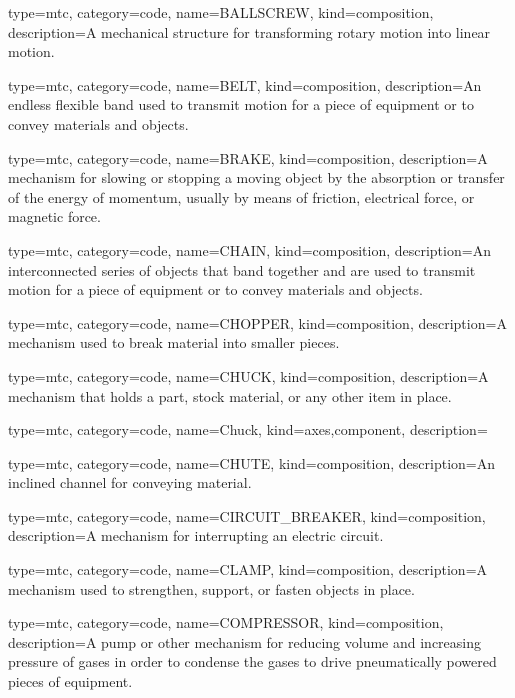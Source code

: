 {
  type=mtc,
  category=code,
  name={BALLSCREW},
  kind={composition},
  description={A mechanical structure for transforming rotary motion into linear motion.}
}


{
  type=mtc,
  category=code,
  name={BELT},
  kind={composition},
  description={An endless flexible band used to transmit motion for a piece of equipment or to convey materials and objects.}
}


{
  type=mtc,
  category=code,
  name={BRAKE},
  kind={composition},
  description={A mechanism for slowing or stopping a moving object by the absorption or transfer of the energy of momentum, usually by means of friction, electrical force, or magnetic force.}
}


{
  type=mtc,
  category=code,
  name={CHAIN},
  kind={composition},
  description={An interconnected series of objects that band together and are used to transmit motion for a piece of equipment or to convey materials and objects.}
}


{
  type=mtc,
  category=code,
  name={CHOPPER},
  kind={composition},
  description={A mechanism used to break material into smaller pieces.}
}


{
  type=mtc,
  category=code,
  name={CHUCK},
  kind={composition},
  description={A mechanism that holds a part, stock material, or any other item in place.}
}


{
  type=mtc,
  category=code,
  name={Chuck},
  kind={axes,component},
  description={}
}


{
  type=mtc,
  category=code,
  name={CHUTE},
  kind={composition},
  description={An inclined channel for conveying material.}
}


{
  type=mtc,
  category=code,
  name={CIRCUIT\_BREAKER},
  kind={composition},
  description={A mechanism for interrupting an electric circuit.}
}


{
  type=mtc,
  category=code,
  name={CLAMP},
  kind={composition},
  description={A mechanism used to strengthen, support, or fasten objects in place.}
}


{
  type=mtc,
  category=code,
  name={COMPRESSOR},
  kind={composition},
  description={A pump or other mechanism for reducing volume and increasing pressure of gases in order to condense the gases to drive pneumatically powered pieces of equipment.}
}


